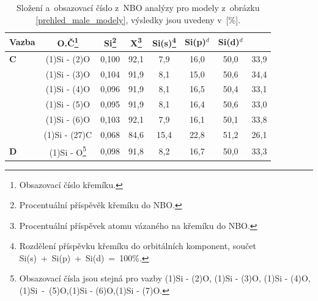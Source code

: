 \documentclass[
digital, %
table,   %
lof,     %
lot,     %
oneside,
]{fithesis3}
\begin{document}
\begin{table}[H]
\begin{minipage}{\textwidth}
\caption{Složení a~obsazovací číslo z~NBO analýzy pro modely z~obrázku \ref{prehled_male_modely}, výsledky jsou uvedeny v~[\%].}
\begin{center}
\begin{tabular}{|l|c|c|c|c|c|c|c|}
\hline
\label{nbo_small} Vazba & O.Č\footnote{Obsazovací číslo křemíku.} & Si\footnote{Procentuální příspěvěk křemíku do NBO.} & X\footnote{Procentuální příspěvek atomu vázaného na křemíku do NBO.} & Si(s)\footnote{Rozdělení příspěvku křemíku do orbitálních komponent, součet Si(s)~+~Si(p)~+~Si(d)~=~100\%.} & Si(p)$^d$ &Si(d)$^d$ \\ \hline
\textbf{C} & (1)Si - (2)O  & 0,100 & 92,1  & 7,9  & 16,0  & 50,0  & 33,9  \\ \hline
& (1)Si - (3)O & 0,104 & 91,9  & 8,1  & 15,0  & 50,6  & 34,4  \\ \hline
&  (1)Si - (4)O& 0,096 & 91,9  & 8,1  & 16,5  & 50,4  & 33,1  \\ \hline
&  (1)Si - (5)O &0,095 & 91,9  & 8,1  & 16,4  & 50,6  & 33,0  \\ \hline
&  (1)Si - (6)O & 0,103 & 92,1  & 7,9  & 16,1  & 50,1  & 33,8  \\ \hline
& (1)Si - (27)C & 0,068 & 84,6  & 15,4  & 22,8  & 51,2  & 26,1  \\ \hline
\textbf{D} & (1)Si - O\footnote{Obsazovací čísla jsou stejná pro vazby (1)Si - (2)O, (1)Si - (3)O, (1)Si - (4)O, (1)Si~-~(5)O,(1)Si - (6)O,(1)Si - (7)O.}  & 0,098 & 91,8  & 8,2  & 16,7  & 50,0  & 33,3  \\ \hline
\end{tabular}
\end{center}
\end{minipage}
\end{table}

\newpage
\end{document}
